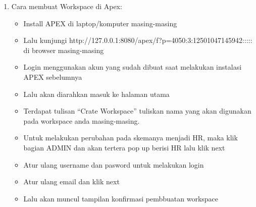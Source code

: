 \begin{enumerate}
	
	
	\item Cara membuat Workspace di Apex:
	
	\begin{itemize}
	\item Install APEX di laptop/komputer masing-masing 
	\end{itemize}
	
	\begin{itemize}
	\item
	Lalu kunjungi http://127.0.0.1:8080/apex/f?p=4050:3:12501047145942::::: di browser masing-masing
	\end{itemize}
	
	\begin{itemize}
	\item Login menggunakan akun yang sudah dibuat saat melakukan instalasi APEX sebelumnya 
	\end{itemize}
	
	\begin{itemize}
	\item Lalu akan diarahkan masuk ke halaman utama 
	\end{itemize}
	
	\begin{itemize}  
	\item Terdapat tulisan “Crate Workspace” tuliskan nama yang akan digunakan pada workspace anda masing-masing.
	\end{itemize}

	\begin{itemize}
	\item Untuk melakukan perubahan pada skemanya menjadi HR, maka klik bagian ADMIN dan akan tertera pop up berisi HR lalu klik next 
	\end{itemize}
	
	\begin{itemize}
	\item Atur ulang username dan pasword untuk melakukan login 
	\end{itemize}

	\begin{itemize}
	\item Atur ulang email dan klik next 
	\end{itemize}
		
	\begin{itemize}
	\item Lalu akan muncul tampilan konfirmasi pembbuatan workspace 
	\end{itemize}
	

\end{enumerate}
